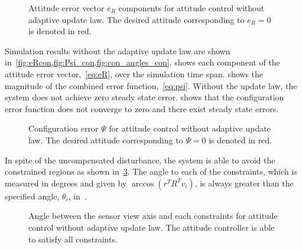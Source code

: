 \begin{figure}[htbp]
    \centering
    
    \caption{Attitude error vector \( e_R \) components for attitude control without adaptive update law.
    The desired attitude corresponding to \( e_R = 0 \) is denoted in red.\label{fig:eRcon}}
\end{figure}
Simulation results without the adaptive update law are shown in~\cref{fig:eRcon,fig:Psi_con,fig:con_angles_con}.
 shows each component of the attitude error vector,~\cref{eq:eR}, over the simulation time span.
 shows the  magnitude of the combined error function,~\cref{eq:psi}.
Without the update law, the system does not achieve zero steady state error. 
 shows that the configuration error function does not converge to zero and there exist steady state errors.
\begin{figure}[htbp]
    \centering
    
    \caption{Configuration error \( \Psi \) for attitude control without adaptive update law.
    The desired attitude corresponding to \( \Psi = 0 \) is denoted in red.\label{fig:Psi_con}}
\end{figure}
In spite of the uncompensated disturbance, the system is able to avoid the constrained regions as shown in~\cref{fig:con_angles_con}.
The angle to each of the constraints, which is measured in degrees and given by \( \arccos(r^T R^T v_i) \), is always greater than the specified angle, \( \theta_i \), in~.
\begin{figure}[htbp]
    \centering
    
    \caption{Angle between the sensor view axis and each constraints for attitude control without adaptive update law.
    The attitude controller is able to satisfy all constraints. \label{fig:con_angles_con}}
\end{figure}

